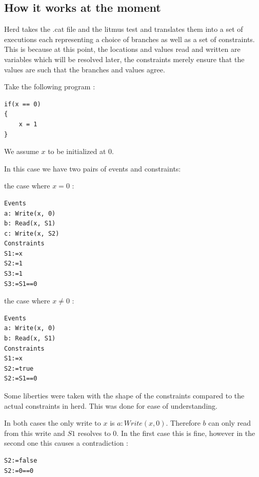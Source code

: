 \documentclass[a4,11pt]{article}
\begin{document}
\subsection{How it works at the moment}

Herd takes the .cat file and the litmus test and translates them into a set of executions each representing a choice of branches as well as a set of constraints. This is because at this point, the locations and values read and written are variables which will be resolved later, the constraints merely ensure that the values are such that the branches and values agree.

Take the following program :

\begin{lstlisting}
if(x == 0)
{
	x = 1
}
\end{lstlisting}
{\footnotesize{We assume $x$ to be initialized at 0.}}

In this case we have two pairs of events and constraints:
\begin{itemize}
\item the case where $x = 0$ :\begin{lstlisting}
Events
a: Write(x, 0)
b: Read(x, S1)
c: Write(x, S2)
Constraints
S1:=x
S2:=1
S3:=1
S3:=S1==0
\end{lstlisting}

\begin{minipage}{\textwidth}
\item the case where $x \neq 0$ : \begin{lstlisting}
Events
a: Write(x, 0)
b: Read(x, S1)
Constraints
S1:=x
S2:=true
S2:=S1==0
\end{lstlisting}
\end{minipage}
\end{itemize}
{\footnotesize{Some liberties were taken with the shape of the constraints compared to the actual constraints in herd. This was done for ease of understanding.}}

In both cases the only write to $x$ is $a: Write(x, 0)$. Therefore $b$ can only read from this write and $S1$ resolves to 0. In the first case this is fine, however in the second one this causes a contradiction :
\begin{lstlisting}
S2:=false
S2:=0==0
\end{lstlisting}
\end{document}
